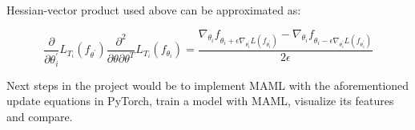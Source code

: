 \documentclass[10pt,twocolumn,letterpaper]{article}
\begin{document}
Hessian-vector product used above can be approximated as:

\begin{equation}
\frac{\partial}{\partial \theta_i^{'}} L_{T_i} (f_{\theta^{'}}) \frac{\partial^2}{\partial \theta \partial \theta^T} L_{T_i} (f_{\theta_i}) = \frac{\nabla_{\theta_i} f_{\theta_i + \epsilon \nabla_{\theta_i^{'}} L(f_{\theta_i^{'}})} - \nabla_{\theta_i} f_{\theta_i - \epsilon \nabla_{\theta_i^{'}} L(f_{\theta_i^{'}})}}{2\epsilon}
\end{equation}

Next steps in the project would be to implement MAML with the aforementioned update equations in PyTorch, train a model with MAML, visualize its features and compare.

{\small


}
\end{document}
